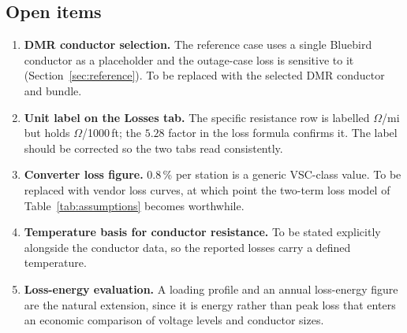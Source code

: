 \subsection{Open items}
\begin{enumerate}[label=(\arabic*)]
  \item \textbf{DMR conductor selection.} The reference case uses a single
        Bluebird conductor as a placeholder and the outage-case loss is
        sensitive to it (Section~\ref{sec:reference}). To be replaced with the
        selected DMR conductor and bundle.
  \item \textbf{Unit label on the Losses tab.} The specific resistance row is
        labelled $\Omega$/mi but holds $\Omega$/1000\,ft; the $5.28$ factor in
        the loss formula confirms it. The label should be corrected so the two
        tabs read consistently.
  \item \textbf{Converter loss figure.} 0.8\,\% per station is a generic
        VSC-class value. To be replaced with vendor loss curves, at which
        point the two-term loss model of Table~\ref{tab:assumptions} becomes
        worthwhile.
  \item \textbf{Temperature basis for conductor resistance.} To be stated
        explicitly alongside the conductor data, so the reported losses carry
        a defined temperature.
  \item \textbf{Loss-energy evaluation.} A loading profile and an annual
        loss-energy figure are the natural extension, since it is energy
        rather than peak loss that enters an economic comparison of voltage
        levels and conductor sizes.
\end{enumerate}
